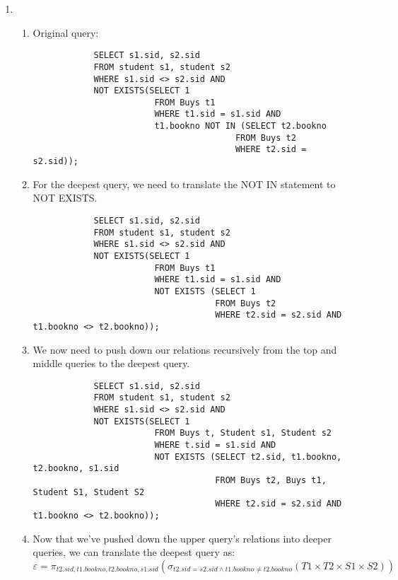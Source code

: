 \documentclass{article}
\begin{document}
\begin{enumerate}
\begin{enumerate}
\begin{enumerate}
        \end{enumerate}

        \newpage

        \item %
        \begin{enumerate}

            \item Original query:
            \begin{lstlisting}
            SELECT s1.sid, s2.sid
            FROM student s1, student s2
            WHERE s1.sid <> s2.sid AND
            NOT EXISTS(SELECT 1
                        FROM Buys t1
                        WHERE t1.sid = s1.sid AND
                        t1.bookno NOT IN (SELECT t2.bookno
                                        FROM Buys t2
                                        WHERE t2.sid = s2.sid));
            \end{lstlisting}

            \item For the deepest query, we need to translate the NOT IN statement to NOT EXISTS.
            \begin{lstlisting}
            SELECT s1.sid, s2.sid
            FROM student s1, student s2
            WHERE s1.sid <> s2.sid AND
            NOT EXISTS(SELECT 1
                        FROM Buys t1
                        WHERE t1.sid = s1.sid AND
                        NOT EXISTS (SELECT 1
                                    FROM Buys t2
                                    WHERE t2.sid = s2.sid AND t1.bookno <> t2.bookno));
            \end{lstlisting}

            \item We now need to push down our relations recursively from the top and middle queries to the deepest query.
            \begin{lstlisting}
            SELECT s1.sid, s2.sid
            FROM student s1, student s2
            WHERE s1.sid <> s2.sid AND
            NOT EXISTS(SELECT 1
                        FROM Buys t, Student s1, Student s2
                        WHERE t.sid = s1.sid AND
                        NOT EXISTS (SELECT t2.sid, t1.bookno, t2.bookno, s1.sid
                                    FROM Buys t2, Buys t1, Student S1, Student S2
                                    WHERE t2.sid = s2.sid AND t1.bookno <> t2.bookno));
            \end{lstlisting}

            \item Now that we've pushed down the upper query's relations into deeper queries, we can translate the deepest
            query as:
            \begin{displaymath}
                \varepsilon = \pi_{t2.sid, t1.bookno, t2.bookno, s1.sid}(\sigma_{t2.sid=s2.sid \wedge t1.bookno \ne t2.bookno}(T1 \times T2 \times S1 \times S2))
            \end{displaymath}


\end{enumerate}
\end{enumerate}
\end{enumerate}
\end{document}
